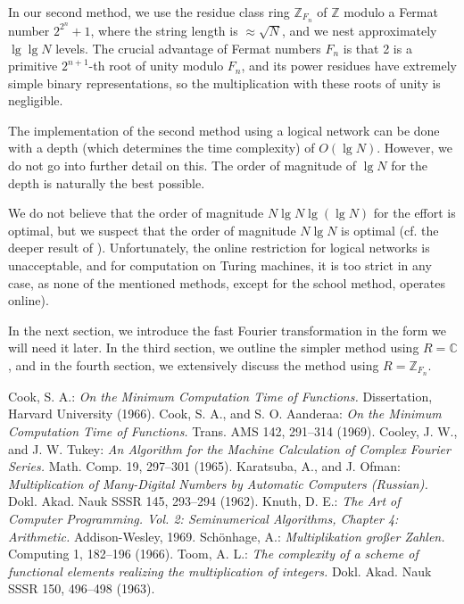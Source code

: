 \documentclass{article}
\begin{document}
In our second method, we use the residue class ring $\mathbb{Z}_{F_n}$ of $\mathbb{Z}$ modulo a Fermat number $2^{2^n} + 1$, where the string length is $\approx \sqrt{N}$, and we nest approximately $\lg \lg N$ levels. The crucial advantage of Fermat numbers $F_n$ is that 2 is a primitive $2^{n+1}$-th root of unity modulo $F_n$, and its power residues have extremely simple binary representations, so the multiplication with these roots of unity is negligible.

The implementation of the second method using a logical network can be done with a depth (which determines the time complexity) of $O(\lg N)$. However, we do not go into further detail on this. The order of magnitude of $\lg N$ for the depth is naturally the best possible.

We do not believe that the order of magnitude $N \lg N \lg(\lg N)$ for the effort is optimal, but we suspect that the order of magnitude $N \lg N$ is optimal (cf. the deeper result of \cite{cook2}). Unfortunately, the online restriction for logical networks is unacceptable, and for computation on Turing machines, it is too strict in any case, as none of the mentioned methods, except for the school method, operates online).

In the next section, we introduce the fast Fourier transformation in the form we will need it later. In the third section, we outline the simpler method using $R = \mathbb{C}$, and in the fourth section, we extensively discuss the method using $R = \mathbb{Z}_{F_n}$.

\begin{thebibliography}{99}
 Cook, S. A.: \textit{On the Minimum Computation Time of Functions.} Dissertation, Harvard University (1966).
 Cook, S. A., and S. O. Aanderaa: \textit{On the Minimum Computation Time of Functions.} Trans. AMS 142, 291--314 (1969).
 Cooley, J. W., and J. W. Tukey: \textit{An Algorithm for the Machine Calculation of Complex Fourier Series.} Math. Comp. 19, 297--301 (1965).
 Karatsuba, A., and J. Ofman: \textit{Multiplication of Many-Digital Numbers by Automatic Computers (Russian).} Dokl. Akad. Nauk SSSR 145, 293--294 (1962).
 Knuth, D. E.: \textit{The Art of Computer Programming. Vol. 2: Seminumerical Algorithms, Chapter 4: Arithmetic.} Addison-Wesley, 1969.
 Schönhage, A.: \textit{Multiplikation großer Zahlen.} Computing 1, 182--196 (1966).
 Toom, A. L.: \textit{The complexity of a scheme of functional elements realizing the multiplication of integers.} Dokl. Akad. Nauk SSSR 150, 496--498 (1963).
\end{thebibliography}
\end{document}
